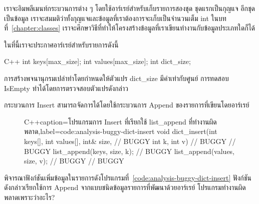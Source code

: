 เรา{\wbr}จะ{\wbr}อิม{\wbr}พลี{\wbr}เมนท์{\wbr}กระบวนการ{\wbr}ต่าง ๆ โดย{\wbr}ใช้{\wbr}อาร์เรย์{\wbr}สำหรับ{\wbr}เก็บ{\wbr}รายการ{\wbr}สอง{\wbr}ชุด{\wbr}
ชุด{\wbr}แรก{\wbr}เป็น{\wbr}กุญแจ อีก{\wbr}ชุด{\wbr}เป็น{\wbr}ข้อมูล{\wbr}
เรา{\wbr}จะ{\wbr}สมมติ{\wbr}ว่า{\wbr}ทั้ง{\wbr}กุญแจ{\wbr}และ{\wbr}ข้อมูล{\wbr}ที่{\wbr}เรา{\wbr}ต้องการ{\wbr}จะ{\wbr}เก็บ{\wbr}เป็น{\wbr}จำนวนเต็ม {\ct int}
ใน{\wbr}บท{\wbr}ที่~\ref{chapter:classes}
เรา{\wbr}จะ{\wbr}ศึกษา{\wbr}วิธี{\wbr}ที่{\wbr}ทำ{\wbr}ให้{\wbr}โครงสร้าง{\wbr}ข้อมูล{\wbr}ที่{\wbr}เรา{\wbr}เขียน{\wbr}ทำงาน{\wbr}กับ{\wbr}ข้อมูล{\wbr}ประเภท{\wbr}ใด{\wbr}ก็ได้{\wbr}

ใน{\wbr}ที่นี้{\wbr}เรา{\wbr}จะ{\wbr}ประกาศ{\wbr}อาร์เรย์{\wbr}สำหรับ{\wbr}รายการ{\wbr}ดังนี้{\wbr}
\latintext
\begin{codelist}{C++}{}
int keys[max_size];
int values[max_size];
int dict_size;
\end{codelist}
\thaitext

การ{\wbr}สร้าง{\wbr}พจนานุกรม{\wbr}เปล่า{\wbr}ทำ{\wbr}โดย{\wbr}กำหนด{\wbr}ให้{\wbr}ตัวแปร {\ct dict\_size} มี{\wbr}ค่า{\wbr}เท่า{\wbr}กับ{\wbr}ศูนย์{\wbr}
การ{\wbr}ทดสอบ IsEmpty ทำ{\wbr}ได้{\wbr}โดย{\wbr}การ{\wbr}ตรวจสอบ{\wbr}ตัวแปร{\wbr}ดังกล่าว{\wbr}

กระบวนการ Insert สามารถ{\wbr}จัดการ{\wbr}ได้{\wbr}โดย{\wbr}ใช้{\wbr}กระบวนการ Append ของ{\wbr}รายการ{\wbr}ที่{\wbr}เขียน{\wbr}โดย{\wbr}อาร์เรย์

\begin{figure}
\latintext
\begin{codelist}{C++}{caption={\thaitext โปรแกรม{\wbr}การ Insert ที่{\wbr}เรียก{\wbr}ใช้ {\ct list\_append} ที่ทำงาน{\wbr}ผิดพลาด\latintext},label=code:analysis-buggy-dict-insert}
void dict_insert(int keys[], int values[], int& size,  // BUGGY
                 int k, int v)                         // BUGGY
{                                                      // BUGGY
  list_append(keys, size, k);                          // BUGGY
  list_append(values, size, v);                        // BUGGY 
}                                                      // BUGGY
\end{codelist}
\thaitext
\end{figure}

\begin{quiz}{}
พิจารณา{\wbr}ฟังก์ชัน{\wbr}เพิ่ม{\wbr}ข้อมูล{\wbr}ใน{\wbr}รายการ{\wbr}ดัง{\wbr}โปรแกรม{\wbr}ที่~\ref{code:analysis-buggy-dict-insert}
ฟังก์ชัน{\wbr}ดังกล่าว{\wbr}เรียก{\wbr}ใช้{\wbr}การ Append จาก{\wbr}แบบ{\wbr}ชนิด{\wbr}ข้อมูล{\wbr}รายการ{\wbr}ที่{\wbr}พัฒนา{\wbr}ด้วย{\wbr}อาร์เรย์
โปรแกรม{\wbr}ทำงาน{\wbr}ผิดพลาด{\wbr}เพราะว่า{\wbr}อะไร? 
\end{quiz}

